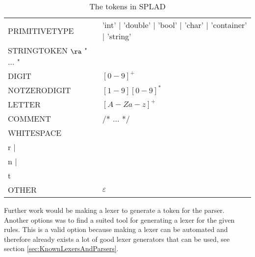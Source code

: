 \begin{table}[H]
\begin{tabular}{l l}
PRIMITIVETYPE & 'int' | 'double' | 'bool' | 'char' | 'container' | 'string' \\
STRINGTOKEN $\ra$ " $\dots$  " \\
DIGIT & $[0 - 9]^+$ \\
NOTZERODIGIT & $[1-9][0-9]^*$ \\
LETTER & $[A-Za-z]^+$\\
COMMENT & /* $\dots$ */ \\
WHITESPACE & \\r | \\n | \\t \\
OTHER & $\varepsilon$ \\
\end{tabular}
\caption{The tokens in SPLAD}
\label{tab:tokens}
\end{table}

Further work would be making a lexer to generate a token for the parser. Another options was to find a suited tool for generating a lexer for the given rules. This is a valid option because making a lexer can be automated and therefore already exists a lot of good lexer generators that can be used, see section \ref{sec:KnownLexersAndParsers}.
